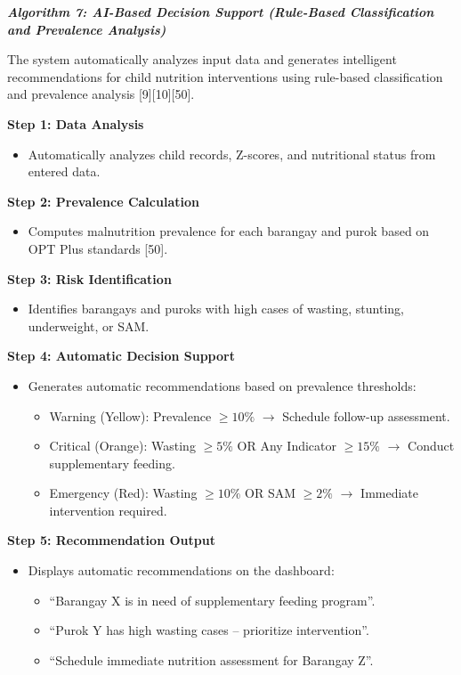\documentclass[12pt, a4paper]{report}
\begin{document}
\noindent \textbf{\textit{Algorithm 7: AI-Based Decision Support (Rule-Based Classification and Prevalence Analysis)}}

The system automatically analyzes input data and generates intelligent recommendations for child nutrition interventions using rule-based classification and prevalence analysis [9][10][50].

\noindent \textbf{Step 1: Data Analysis}
\begin{itemize}
    \item Automatically analyzes child records, Z-scores, and nutritional status from entered data.
\end{itemize}

\noindent \textbf{Step 2: Prevalence Calculation}
\begin{itemize}
    \item Computes malnutrition prevalence for each barangay and purok based on OPT Plus standards [50].
\end{itemize}

\noindent \textbf{Step 3: Risk Identification}
\begin{itemize}
    \item Identifies barangays and puroks with high cases of wasting, stunting, underweight, or SAM.
\end{itemize}

\noindent \textbf{Step 4: Automatic Decision Support}
\begin{itemize}
    \item Generates automatic recommendations based on prevalence thresholds:
    \begin{itemize}
        \item Warning (Yellow): Prevalence \(\geq 10\%\) \(\rightarrow\) Schedule follow-up assessment.
        \item Critical (Orange): Wasting \(\geq 5\%\) OR Any Indicator \(\geq 15\%\) \(\rightarrow\) Conduct supplementary feeding.
        \item Emergency (Red): Wasting \(\geq 10\%\) OR SAM \(\geq 2\%\) \(\rightarrow\) Immediate intervention required.
    \end{itemize}
\end{itemize}

\noindent \textbf{Step 5: Recommendation Output}
\begin{itemize}
    \item Displays automatic recommendations on the dashboard:
    \begin{itemize}
        \item ``Barangay X is in need of supplementary feeding program''.
        \item ``Purok Y has high wasting cases -- prioritize intervention''.
        \item ``Schedule immediate nutrition assessment for Barangay Z''.
    \end{itemize}
\end{itemize}
\end{document}

